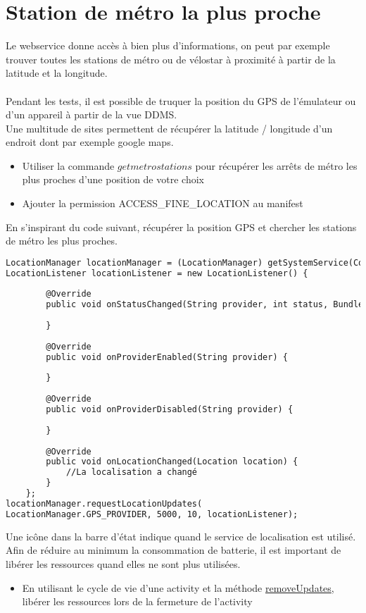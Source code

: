 \documentclass{article}
\begin{document}
\section{Station de métro la plus proche}
Le webservice donne accès à bien plus d'informations, on peut par exemple
trouver toutes les stations de métro ou de vélostar à proximité à partir de la
latitude et la longitude.\\\\
Pendant les tests, il est possible de truquer la position du GPS de l'émulateur
ou d'un appareil à partir de la vue DDMS.\\
Une multitude de sites permettent de récupérer la latitude / longitude d'un
endroit dont par exemple google maps.
\begin{itemize} 
  \item Utiliser la commande $getmetrostations$ pour récupérer les arrêts de
  métro les plus proches d'une position de votre choix
  \item Ajouter la permission ACCESS\_FINE\_LOCATION au manifest 
\end{itemize}
En s'inspirant du code suivant, récupérer la position GPS et chercher les
stations de métro les plus proches.
\begin{lstlisting}[language=XML]
LocationManager locationManager = (LocationManager) getSystemService(Context.LOCATION_SERVICE);
LocationListener locationListener = new LocationListener() {
		
		@Override
		public void onStatusChanged(String provider, int status, Bundle extras) {
			
		}
		
		@Override
		public void onProviderEnabled(String provider) {
			
		}
		
		@Override
		public void onProviderDisabled(String provider) {
		
		}
		
		@Override
		public void onLocationChanged(Location location) {
			//La localisation a changé
		}
	};
locationManager.requestLocationUpdates(
LocationManager.GPS_PROVIDER, 5000, 10, locationListener);
\end{lstlisting}
Une icône dans la barre d'état indique quand le service de localisation
  est utilisé. Afin de réduire au minimum la consommation de batterie, il est
  important de libérer les ressources quand elles ne sont plus utilisées. 
\begin{itemize} 
  \item En utilisant le cycle de vie d'une activity et la méthode
  \href{http://developer.android.com/reference/android/location/LocationManager.html#removeUpdates(android.location.LocationListener)}{removeUpdates},
  libérer les ressources lors de la fermeture de l'activity
\end{itemize}
\end{document}
